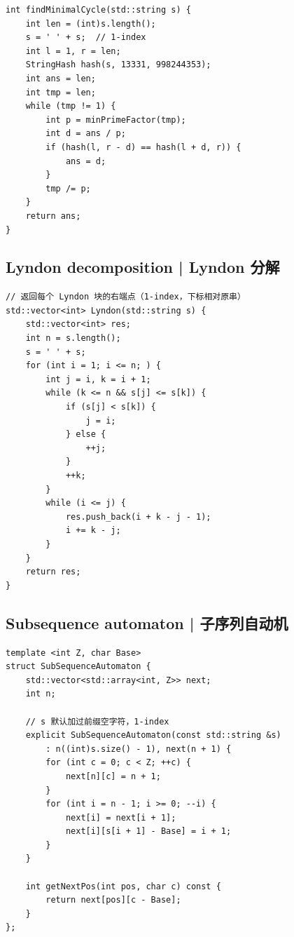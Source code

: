
    \begin{lstlisting}
int findMinimalCycle(std::string s) {
    int len = (int)s.length();
    s = ' ' + s;  // 1-index
    int l = 1, r = len;
    StringHash hash(s, 13331, 998244353);
    int ans = len;
    int tmp = len;
    while (tmp != 1) {
        int p = minPrimeFactor(tmp);
        int d = ans / p;
        if (hash(l, r - d) == hash(l + d, r)) {
            ans = d;
        }
        tmp /= p;
    }
    return ans;
}
    \end{lstlisting}

\subsection{Lyndon decomposition | Lyndon 分解}


    \begin{lstlisting}
// 返回每个 Lyndon 块的右端点（1-index，下标相对原串）
std::vector<int> Lyndon(std::string s) {
    std::vector<int> res;
    int n = s.length();
    s = ' ' + s;
    for (int i = 1; i <= n; ) {
        int j = i, k = i + 1;
        while (k <= n && s[j] <= s[k]) {
            if (s[j] < s[k]) {
                j = i;
            } else {
                ++j;
            }
            ++k;
        }
        while (i <= j) {
            res.push_back(i + k - j - 1);
            i += k - j;
        }
    }
    return res;
}
    \end{lstlisting}

\subsection{Subsequence automaton | 子序列自动机}


    \begin{lstlisting}
template <int Z, char Base>
struct SubSequenceAutomaton {
    std::vector<std::array<int, Z>> next;
    int n;

    // s 默认加过前缀空字符，1-index
    explicit SubSequenceAutomaton(const std::string &s)
        : n((int)s.size() - 1), next(n + 1) {
        for (int c = 0; c < Z; ++c) {
            next[n][c] = n + 1;
        }
        for (int i = n - 1; i >= 0; --i) {
            next[i] = next[i + 1];
            next[i][s[i + 1] - Base] = i + 1;
        }
    }

    int getNextPos(int pos, char c) const {
        return next[pos][c - Base];
    }
};
    \end{lstlisting}

